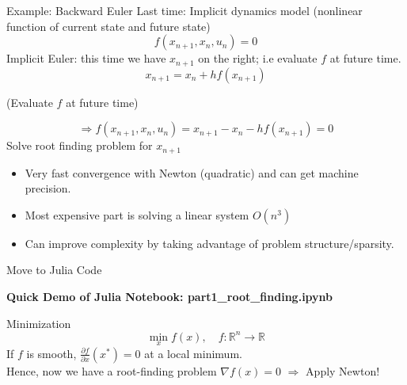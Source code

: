 \begin{frame}{Example: Backward Euler}
Last time: Implicit dynamics model (nonlinear function of current state and future state)
$$
f(x_{n+1}, x_n, u_n) = 0
$$
Implicit Euler: this time we have $x_{n+1}$ on the right; i.e evaluate $f$ at future time.
$$
x_{n+1} = x_n + h f(x_{n+1})
$$

(Evaluate $f$ at future time)

$$
\Rightarrow f(x_{n+1}, x_n, u_n) = x_{n+1} - x_n - h f(x_{n+1}) = 0
$$
Solve root finding problem for $x_{n+1}$
\begin{itemize}
    \item Very fast convergence with Newton (quadratic) and can get machine precision.
    \item Most expensive part is solving a linear system $O(n^3)$
    \item Can improve complexity by taking advantage of problem structure/sparsity.
\end{itemize} 
\end{frame}


\begin{frame}{Move to Julia Code}
\begin{center}
    \textbf{Quick Demo of Julia Notebook: part1\_root\_finding.ipynb}
\end{center}
\end{frame}


\begin{frame}[t]{Minimization}
\[
\min_x f(x), \quad f:\mathbb{R}^n \to \mathbb{R}
\]
If $f$ is smooth, $\frac{\partial f}{\partial x}(x^*) = 0$ at a local minimum.\\
Hence, now we have a root-finding problem $\nabla f(x) = 0$ $\Rightarrow$ Apply Newton!

\medskip

\end{frame}


